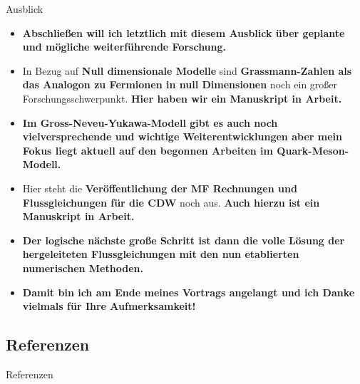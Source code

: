 \documentclass[10pt]{beamer}
\begin{document}
\begin{frame}{Ausblick}
{		\begin{itemize}
			\item \textbf{Abschließen will ich letztlich mit diesem Ausblick über geplante und mögliche weiterführende Forschung.}
			\item In Bezug auf\textbf{ Null dimensionale Modelle } sind \textbf{Grassmann-Zahlen als das Analogon zu Fermionen in null Dimensionen} noch ein großer Forschungsschwerpunkt.\textbf{ Hier haben wir ein Manuskript in Arbeit.}
			\item \textbf{Im Gross-Neveu-Yukawa-Modell gibt es auch noch vielversprechende und wichtige Weiterentwicklungen aber mein Fokus liegt aktuell auf den begonnen Arbeiten im Quark-Meson-Modell.}
			\item Hier steht die \textbf{Veröffentlichung der MF Rechnungen und Flussgleichungen für die CDW} noch aus. \textbf{Auch hierzu ist ein Manuskript in Arbeit.}
			\item \textbf{Der logische nächste große Schritt ist dann die volle Lösung der hergeleiteten Flussgleichungen mit den nun etablierten numerischen Methoden.}
		\end{itemize}\vspace{1em}
		\begin{itemize}
			\item \textbf{Damit bin ich am Ende meines Vortrags angelangt und ich Danke vielmals für Ihre Aufmerksamkeit!}
		\end{itemize}
	}
\end{frame}

{
\begin{frame}
\end{frame}
}

\appendix
\begin{backup}

\section{Referenzen}
\begin{frame}[allowframebreaks]{Referenzen}
	\begingroup
		\printbibliography[heading=none]
	\endgroup
\end{frame}





\end{backup}
\end{document}
